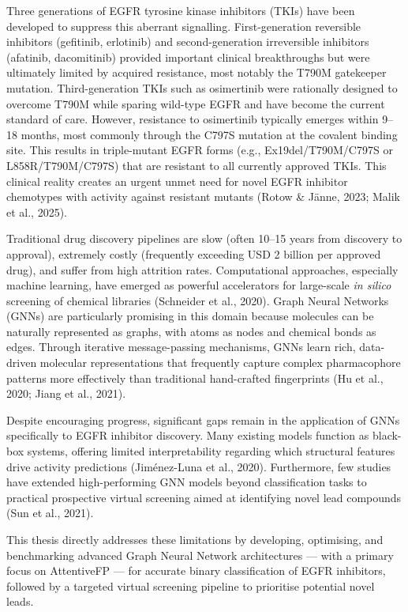 Three generations of EGFR tyrosine kinase inhibitors (TKIs) have been developed to suppress this aberrant signalling. First-generation reversible inhibitors (gefitinib, erlotinib) and second-generation irreversible inhibitors (afatinib, dacomitinib) provided important clinical breakthroughs but were ultimately limited by acquired resistance, most notably the T790M gatekeeper mutation. Third-generation TKIs such as osimertinib were rationally designed to overcome T790M while sparing wild-type EGFR and have become the current standard of care. However, resistance to osimertinib typically emerges within 9--18 months, most commonly through the C797S mutation at the covalent binding site. This results in triple-mutant EGFR forms (e.g., Ex19del/T790M/C797S or L858R/T790M/C797S) that are resistant to all currently approved TKIs. This clinical reality creates an urgent unmet need for novel EGFR inhibitor chemotypes with activity against resistant mutants (Rotow \& Jänne, 2023; Malik et al., 2025).

Traditional drug discovery pipelines are slow (often 10--15 years from discovery to approval), extremely costly (frequently exceeding USD 2 billion per approved drug), and suffer from high attrition rates. Computational approaches, especially machine learning, have emerged as powerful accelerators for large-scale \textit{in silico} screening of chemical libraries (Schneider et al., 2020). Graph Neural Networks (GNNs) are particularly promising in this domain because molecules can be naturally represented as graphs, with atoms as nodes and chemical bonds as edges. Through iterative message-passing mechanisms, GNNs learn rich, data-driven molecular representations that frequently capture complex pharmacophore patterns more effectively than traditional hand-crafted fingerprints (Hu et al., 2020; Jiang et al., 2021).

Despite encouraging progress, significant gaps remain in the application of GNNs specifically to EGFR inhibitor discovery. Many existing models function as black-box systems, offering limited interpretability regarding which structural features drive activity predictions (Jiménez-Luna et al., 2020). Furthermore, few studies have extended high-performing GNN models beyond classification tasks to practical prospective virtual screening aimed at identifying novel lead compounds (Sun et al., 2021).

This thesis directly addresses these limitations by developing, optimising, and benchmarking advanced Graph Neural Network architectures — with a primary focus on AttentiveFP — for accurate binary classification of EGFR inhibitors, followed by a targeted virtual screening pipeline to prioritise potential novel leads.

